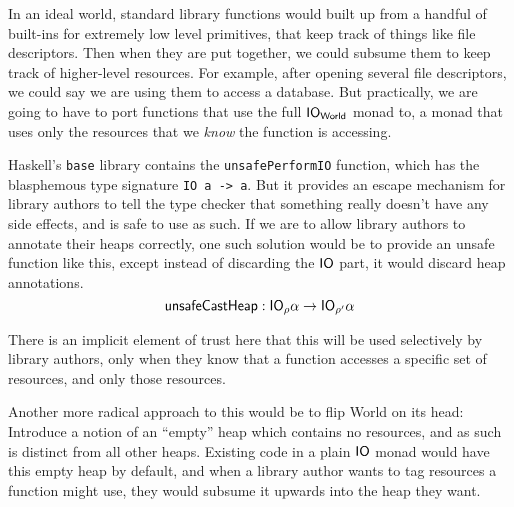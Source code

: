 In an ideal world, standard library functions would built up from a
handful of built-ins for extremely low level primitives, that keep
track of things like file descriptors. Then when they are put
together, we could subsume them to keep track of higher-level
resources. For example, after opening several file descriptors, we
could say we are using them to access a database. But practically, we
are going to have to port functions that use the full
$\mathsf{IO}_{\textsf{World}}$ monad to, a monad that uses only the resources
that we \emph{know} the function is accessing.

Haskell's \texttt{base} library contains the
\texttt{unsafePerformIO} function, which has the
blasphemous type signature \texttt{IO a -> a}. But it
provides an escape mechanism for library authors to tell the type
checker that something really doesn't have any side effects, and is
safe to use as such. If we are to allow library authors to annotate
their heaps correctly, one such solution would be to provide an
unsafe function like this, except instead of discarding the $\mathsf{IO}$
part, it would discard heap annotations.
\[ \textsf{unsafeCastHeap} : \mathsf{IO}_\rho \alpha \rightarrow \mathsf{IO}_{\rho'} \alpha \]

There is an
implicit element of trust here that this will be used selectively by
library authors, only when they know that a function accesses a
specific set of resources, and only those resources.

Another more radical approach to this would be to flip \textsf{World}
on its head: Introduce a notion of an ``empty'' heap which contains no
resources, and as such is distinct from all other heaps. Existing code
in a plain $\mathsf{IO}$ monad would have this empty heap by default, and when a
library author wants to tag resources a function might use, they would
subsume it upwards into the heap they want.


